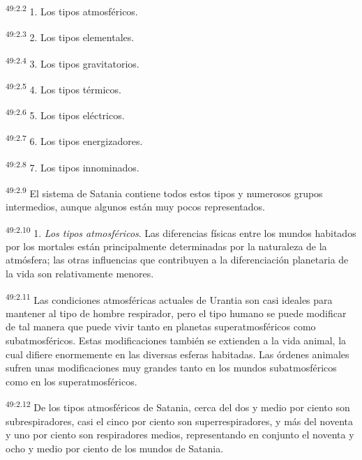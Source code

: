 \par
\textsuperscript{49:2.2} 1. Los tipos atmosféricos.

\par
\textsuperscript{49:2.3} 2. Los tipos elementales.

\par
\textsuperscript{49:2.4} 3. Los tipos gravitatorios.

\par
\textsuperscript{49:2.5} 4. Los tipos térmicos.

\par
\textsuperscript{49:2.6} 5. Los tipos eléctricos.

\par
\textsuperscript{49:2.7} 6. Los tipos energizadores.

\par
\textsuperscript{49:2.8} 7. Los tipos innominados.

\par
\textsuperscript{49:2.9} El sistema de Satania contiene todos estos tipos y numerosos grupos intermedios, aunque algunos están muy pocos representados.

\par
\textsuperscript{49:2.10} 1. \textit{Los tipos atmosféricos}. Las diferencias físicas entre los mundos habitados por los mortales están principalmente determinadas por la naturaleza de la atmósfera; las otras influencias que contribuyen a la diferenciación planetaria de la vida son relativamente menores.

\par
\textsuperscript{49:2.11} Las condiciones atmosféricas actuales de Urantia son casi ideales para mantener al tipo de hombre respirador, pero el tipo humano se puede modificar de tal manera que puede vivir tanto en planetas superatmosféricos como subatmosféricos. Estas modificaciones también se extienden a la vida animal, la cual difiere enormemente en las diversas esferas habitadas. Las órdenes animales sufren unas modificaciones muy grandes tanto en los mundos subatmosféricos como en los superatmosféricos.

\par
\textsuperscript{49:2.12} De los tipos atmosféricos de Satania, cerca del dos y medio por ciento son subrespiradores, casi el cinco por ciento son superrespiradores, y más del noventa y uno por ciento son respiradores medios, representando en conjunto el noventa y ocho y medio por ciento de los mundos de Satania.

